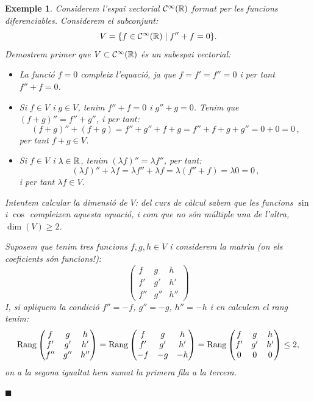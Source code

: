 \documentclass[
  11pt,
]{book}
\numberwithin{dummy}{section}
\theoremstyle{maincolornumbox}
\theoremstyle{blacknumex}
\newtheorem{exampleT}{Exemple}[chapter]
\theoremstyle{blacknumbox}
\theoremstyle{maincolornum}
\newenvironment{example}{\begin{exampleT}}{\hfill{\tiny\ensuremath{\blacksquare}}\end{exampleT}}
\newlength\esp
\begin{document}
\begin{example}
\protect\hypertarget{exm:sincos}{}\label{exm:sincos}Considerem l'espai vectorial
\(\mathcal{C}^\infty(\mathbb{R})\) format per les funcions diferenciables. Considerem el
subconjunt: \[V=\{ f \in \mathcal{C}^\infty(\mathbb{R}) \mid f''+f=0\}.\] Demostrem
primer que \(V\subset\mathcal{C}^\infty(\mathbb{R})\) és un subespai vectorial:

\begin{itemize}
\item
  La funció \(f=0\) compleix l'equació, ja que \(f=f'=f''=0\) i per tant
  \(f''+f=0\).
\item
  Si \(f\in V\) i \(g\in V\), tenim \(f''+f=0\) i \(g''+g=0\). Tenim que
  \((f+g)''=f''+g''\), i per tant:
  \[(f+g)''+(f+g)=f''+g''+f+g=f''+f+g+g''=0+0=0\,,\] per tant
  \(f+g\in V\).
\item
  Si \(f\in V\) i \(\lambda\in\mathbb{R}\), tenim \((\lambda f)''=\lambda f''\), per
  tant:
  \[(\lambda f)''+\lambda f=\lambda f''+\lambda f=\lambda(f''+f)=\lambda 0=0 \, ,\]
  i per tant \(\lambda f \in V\).
\end{itemize}

Intentem calcular la dimensió de \(V\): del curs de càlcul sabem que les
funcions \(\sin\) i \(\cos\) compleixen aquesta equació, i com que no són
múltiple una de l'altra, \(\dim(V)\geq 2\).

Suposem que tenim tres funcions \(f,g,h\in V\) i considerem la matriu (on
els coeficients són funcions!): \[\begin{pmatrix}
f & g & h\\ f' & g' & h' \\ f'' & g'' & h''
\end{pmatrix}\] I, si apliquem la condició \(f''=-f\), \(g''=-g\), \(h''=-h\)
i en calculem el rang tenim: \[\operatorname{Rang}\begin{pmatrix}
f & g & h\\ f' & g' & h' \\ f'' & g'' & h''
\end{pmatrix} =
\operatorname{Rang}\begin{pmatrix}
f & g & h\\ f' & g' & h' \\ -f & -g & -h
\end{pmatrix}=
\operatorname{Rang}\begin{pmatrix}
f & g & h\\ f' & g' & h' \\ 0 & 0 & 0
\end{pmatrix}\leq 2,\] on a la segona igualtat hem sumat la primera fila
a la tercera.


\end{example}
\end{document}

